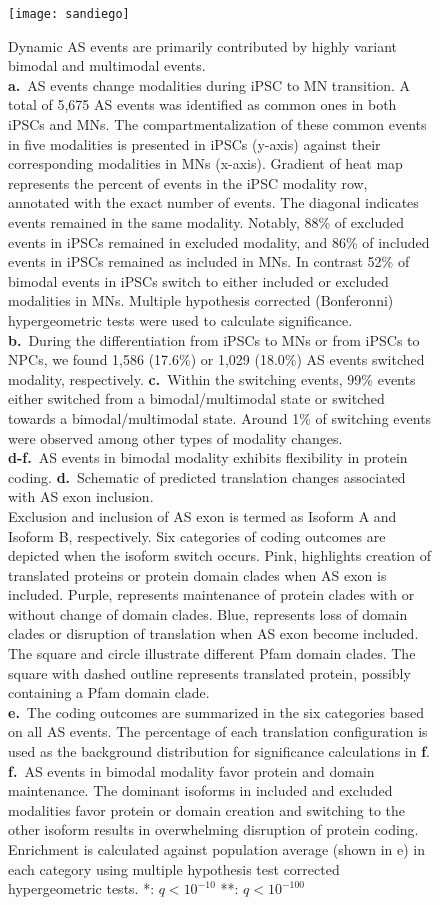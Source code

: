 \begin{figure}[h] 
  \centering
  \texttt{[image: sandiego]}
  \caption[Dynamic AS events are primarily contributed by highly variant bimodal and multimodal events.]{Dynamic AS events are primarily contributed by highly variant bimodal and multimodal events.\\
\textbf{a.}~AS events change modalities during iPSC to MN transition. A total of 5,675 AS events was identified as common ones in both iPSCs and MNs. The compartmentalization of these common events in five modalities is presented in iPSCs (y-axis) against their corresponding modalities in MNs (x-axis). Gradient of heat map represents the percent of events in the iPSC modality row, annotated with the exact number of events. The diagonal indicates events remained in the same modality. Notably, 88\% of excluded events in iPSCs remained in excluded modality, and 86\% of included events in iPSCs remained as included in MNs. In contrast 52\% of bimodal events in iPSCs switch to either included or excluded modalities in MNs. Multiple hypothesis corrected (Bonferonni) hypergeometric tests were used to calculate significance.\\
\textbf{b.}~During the differentiation from iPSCs to MNs or from iPSCs to NPCs, we found 1,586 (17.6\%) or 1,029 (18.0\%) AS events switched modality, respectively. 
\textbf{c.}~Within the switching events, 99\% events either switched from a bimodal/multimodal state or switched towards a bimodal/multimodal state. Around 1\% of switching events were observed among other types of modality changes.\\
\textbf{d-f.}~AS events in bimodal modality exhibits flexibility in protein coding. 
\textbf{d.}~Schematic of predicted translation changes associated with AS exon inclusion.\\ Exclusion and inclusion of AS exon is termed as Isoform A and Isoform B, respectively. Six categories of coding outcomes are depicted when the isoform switch occurs. Pink, highlights creation of translated proteins or protein domain clades when AS exon is included. Purple, represents maintenance of protein clades with or without change of domain clades. Blue, represents loss of domain clades or disruption of translation when AS exon become included. The square and circle illustrate different Pfam domain clades. The square with dashed outline represents translated protein, possibly containing a Pfam domain clade.\\
\textbf{e.}~The coding outcomes are summarized in the six categories based on all AS events. The percentage of each translation configuration is used as the background distribution for significance calculations in \textbf{f}.\\
\textbf{f.}~AS events in bimodal modality favor protein and domain maintenance. The dominant isoforms in included and excluded modalities favor protein or domain creation and switching to the other isoform results in overwhelming disruption of protein coding. Enrichment is calculated against population average (shown in e) in each category using multiple hypothesis test corrected hypergeometric tests. *: $q< 10^{-10}$  **: $q< 10^{-100}$
}
  \label{fig:dynamic_modalities}
\end{figure}

